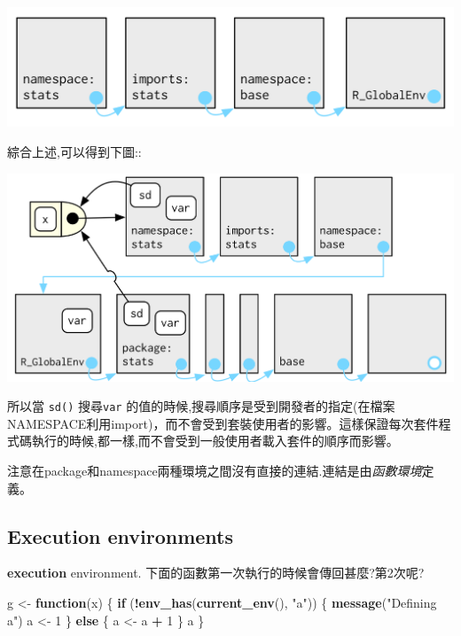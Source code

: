 \documentclass[]{book}
\newenvironment{Shaded}{\begin{snugshade}}{\end{snugshade}}
\newcommand{\KeywordTok}[1]{\textcolor[rgb]{0.13,0.29,0.53}{\textbf{#1}}}
\newcommand{\DecValTok}[1]{\textcolor[rgb]{0.00,0.00,0.81}{#1}}
\newcommand{\StringTok}[1]{\textcolor[rgb]{0.31,0.60,0.02}{#1}}
\newcommand{\ControlFlowTok}[1]{\textcolor[rgb]{0.13,0.29,0.53}{\textbf{#1}}}
\newcommand{\OperatorTok}[1]{\textcolor[rgb]{0.81,0.36,0.00}{\textbf{#1}}}
\newcommand{\NormalTok}[1]{#1}
\theoremstyle{definition}
\theoremstyle{definition}
\theoremstyle{definition}
\theoremstyle{remark}
\begin{document}
\begin{center}\includegraphics{diagrams/environments/namespace-env} \end{center}

綜合上述,可以得到下圖::

\begin{center}\includegraphics{diagrams/environments/namespace} \end{center}

所以當 \texttt{sd()} 搜尋\texttt{var}
的值的時候,搜尋順序是受到開發者的指定(在檔案NAMESPACE利用import)，而不會受到套裝使用者的影響。這樣保證每次套件程式碼執行的時候,都一樣,而不會受到一般使用者載入套件的順序而影響。

注意在package和namespace兩種環境之間沒有直接的連結.連結是由\emph{函數環境}定義。

\subsection{Execution environments}\label{execution-environments}

\textbf{execution} environment.
下面的函數第一次執行的時候會傳回甚麼?第2次呢?

\begin{Shaded}
\begin{Highlighting}[]
\NormalTok{g <-}\StringTok{ }\ControlFlowTok{function}\NormalTok{(x) \{}
  \ControlFlowTok{if}\NormalTok{ (}\OperatorTok{!}\KeywordTok{env_has}\NormalTok{(}\KeywordTok{current_env}\NormalTok{(), }\StringTok{"a"}\NormalTok{)) \{}
    \KeywordTok{message}\NormalTok{(}\StringTok{"Defining a"}\NormalTok{)}
\NormalTok{    a <-}\StringTok{ }\DecValTok{1}
\NormalTok{  \} }\ControlFlowTok{else}\NormalTok{ \{}
\NormalTok{    a <-}\StringTok{ }\NormalTok{a }\OperatorTok{+}\StringTok{ }\DecValTok{1}
\NormalTok{  \}}
\NormalTok{  a}
\NormalTok{\}}
\end{Highlighting}
\end{Shaded}
\end{document}
